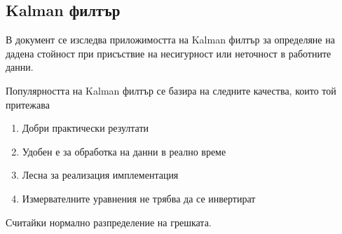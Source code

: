 \subsection{Kalman филтър} \label{kalmanSect}

В документ \cite{kalmanTutorial} се изследва приложимостта на Kalman филтър за определяне на дадена стойност при присъствие на несигурност или неточност в работните данни.

Популярността на Kalman филтър се базира на следните качества, които той притежава

\begin{enumerate}
    \item Добри практически резултати
    \item Удобен е за обработка на данни в реално време
    \item Лесна за реализация имплементация
    \item Измервателните уравнения не трябва да се инвертират
\end{enumerate}

Считайки нормално разпределение на грешката.